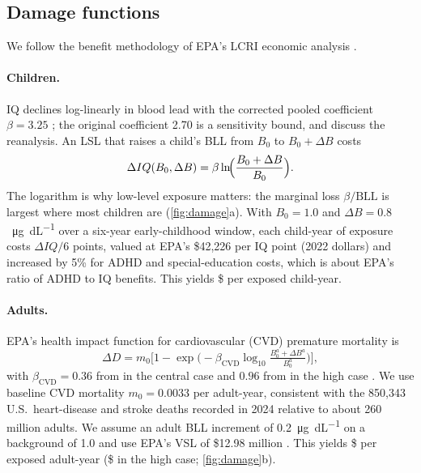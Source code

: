 \documentclass[11pt]{article}
\newcommand{\BLL}{\mathrm{BLL}}
\newcommand{\ugdl}{\si{\micro\gram\per\deci\liter}}
\begin{document}
\subsection{Damage functions}\label{sec:damage}
We follow the benefit methodology of EPA's LCRI economic analysis \citep{epa2024ea}.

\paragraph{Children.} IQ declines log-linearly in blood lead with the corrected pooled coefficient
$\beta=3.25$ \citep{lanphear2005,lanphear2019}; the original coefficient 2.70 is a sensitivity bound,
and \citet{crump2013} discuss the reanalysis. An LSL that raises a child's BLL from $B_0$ to
$B_0+\Delta B$ costs
\begin{equation}
\Delta IQ(B_0,\Delta B)=\beta\ln\!\Bigl(\frac{B_0+\Delta B}{B_0}\Bigr).\label{eq:iq}
\end{equation}
The logarithm is why low-level exposure matters: the marginal loss $\beta/\BLL$ is largest where
most children are (\cref{fig:damage}a). With $B_0=1.0$ and $\Delta B=0.8$~\ugdl{} over a six-year
early-childhood window, each child-year of exposure costs $\Delta IQ/6$ points, valued at EPA's
\$42,226 per IQ point (2022 dollars) and increased by 5\% for ADHD and special-education costs,
which is about EPA's ratio of ADHD to IQ benefits. This yields \$\VChild{} per exposed child-year.

\paragraph{Adults.} EPA's health impact function for cardiovascular (CVD) premature mortality is
\begin{equation}
\Delta D=m_0\bigl[1-\exp\bigl(-\beta_{\mathrm{CVD}}\log_{10}\tfrac{B_0^a+\Delta B^a}{B_0^a}\bigr)\bigr],
\label{eq:cvd}
\end{equation}
with $\beta_{\mathrm{CVD}}=0.36$ from \citet{aoki2016} in the central case and $0.96$ from
\citet{lanphear2018} in the high case \citep{brown2020,epa2024ea}. We use baseline CVD mortality
$m_0=0.0033$ per adult-year, consistent with the 850,343 U.S.\ heart-disease and stroke deaths
recorded in 2024 \citep{nchs2024} relative to about 260 million adults. We assume an adult BLL
increment of 0.2~\ugdl{} on a background of 1.0 and use EPA's VSL of \$12.98 million \citep{epa2024ea}.
This yields \$\VAdult{} per exposed adult-year (\$\VAdultHigh{} in the high case;
\cref{fig:damage}b).
\end{document}

